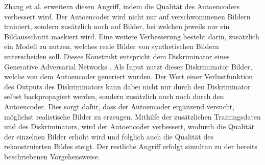 Zhang et al. \cite{P-4} erweitern diesen Angriff, indem die Qualität des Autoencoders verbessert wird. 
Der Autoencoder wird nicht nur auf verschwommenen Bildern trainiert, sondern zusätzlich noch auf Bilder, bei welchen jeweils nur ein Bildausschnitt maskiert wird.
Eine weitere Verbesserung besteht darin, zusätzlich ein Modell zu nutzen, welches reale Bilder von synthetischen Bildern unterscheiden soll.
Dieses Konstrukt entspricht dem Diskriminator eines Generative Adversarial Networks \cite{P-86}.
Als Input nutzt dieser Diskriminator Bilder, welche von dem Autoencoder generiert wurden.
Der Wert einer Verlustfunktion des Outputs des Diskriminators kann dabei nicht nur durch den Diskriminator selbst backpropagiert werden, sondern zusätzlich auch noch durch den Autoencoder.
Dies sorgt dafür, dass der Autoencoder ergänzend versucht, möglichst realistische Bilder zu erzeugen.
Mithilfe der zusätzlichen Trainingsdaten und des Diskriminators, wird der Autoencoder verbessert, wodurch die Qualität der einzelnen Bilder erhöht wird und folglich auch die Qualität des rekonstruierten Bildes steigt.
Der restliche Angriff erfolgt simultan zu der bereits beschriebenen Vorgehensweise.


